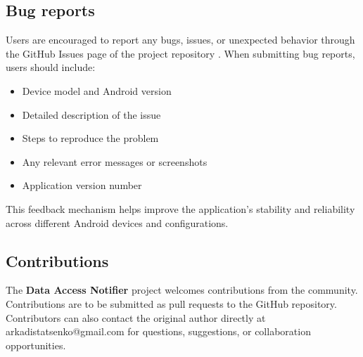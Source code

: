 \subsection{Bug reports}

Users are encouraged to report any bugs, issues, or unexpected behavior through the GitHub Issues page of the project repository \cite{data-access-notifier}. When submitting bug reports, users should include:

\begin{itemize}
    \item Device model and Android version
    \item Detailed description of the issue
    \item Steps to reproduce the problem
    \item Any relevant error messages or screenshots
    \item Application version number
\end{itemize}

This feedback mechanism helps improve the application's stability and reliability across different Android devices and configurations.

\subsection{Contributions}
The \textbf{Data Access Notifier} project welcomes contributions from the community. Contributions are to be submitted as pull requests to the GitHub repository. Contributors can also contact the original author directly at arkadistatsenko@gmail.com for questions, suggestions, or collaboration opportunities.




